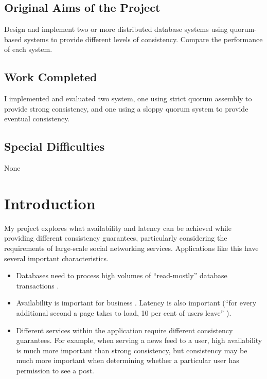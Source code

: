 \documentclass[12pt,a4paper,twoside,openany]{report}
\begin{document}


\section*{Original Aims of the Project}

Design and implement two or more distributed database systems using quorum-based systems to provide different levels of consistency. Compare the performance of each system.

\section*{Work Completed}

I implemented and evaluated two system, one using strict quorum assembly to provide strong consistency, and one using a sloppy quorum system to provide eventual consistency.

\section*{Special Difficulties}

None

\tableofcontents



\pagestyle{headings}

\chapter{Introduction}


My project explores what availability and latency can be achieved while providing different consistency guarantees, particularly considering the requirements of large-scale social networking services. Applications like this have several important characteristics.

\begin{itemize}
\item
Databases need to process high volumes of ``read-mostly'' database transactions \cite{fox1999harvest} \cite{nunemaker}.

\item
Availability is important for business \cite{decandia2007dynamo}. Latency is also important (``for every additional second a page takes to load, 10 per cent of users leave'' \cite{clark_2018}).

\item
Different services within the application require different consistency guarantees. For example, when serving a news feed to a user, high availability is much more important than strong consistency, but consistency may be much more important when determining whether a particular user has permission to see a post.

\end{itemize}
\end{document}
